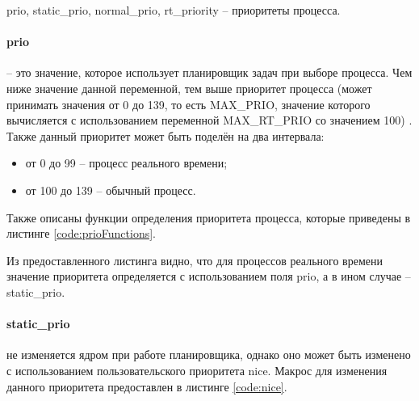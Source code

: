 prio, static\_prio, normal\_prio, rt\_priority -- приоритеты процесса.

\paragraph*{prio} -- это значение, которое использует планировщик задач при выборе процесса. Чем ниже значение данной переменной, тем выше приоритет процесса (может принимать значения от 0 до 139, то есть MAX\_PRIO, значение которого вычисляется с использованием переменной MAX\_RT\_PRIO со значением 100) \cite{linuxPriority}. Также данный приоритет может быть поделён на два интервала:
\begin{itemize}[leftmargin=1.6\parindent]
\item от 0 до 99 -- процесс реального времени;
\item от 100 до 139 -- обычный процесс.
\end{itemize}

Также описаны функции определения приоритета процесса, которые приведены в листинге \ref{code:prioFunctions}.


Из предоставленного листинга видно, что для процессов реального времени значение приоритета определяется с использованием поля prio, а в ином случае -- static\_prio.

\paragraph*{static\_prio} не изменяется ядром при работе планировщика, однако оно может быть изменено с использованием пользовательского приоритета nice. Макрос для изменения данного приоритета предоставлен в листинге \ref{code:nice}.


